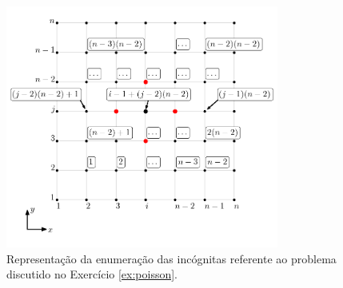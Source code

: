 \begin{ex}
  \begin{figure}[H]
    \centering
    \includegraphics[width=0.8\textwidth]{./cap_sislin/dados/figMalha2D/fig}
    \caption{Representação da enumeração das incógnitas referente ao problema discutido no Exercício \ref{ex:poisson}.}
    \label{fig:malha2d}
  \end{figure}


\end{ex}
